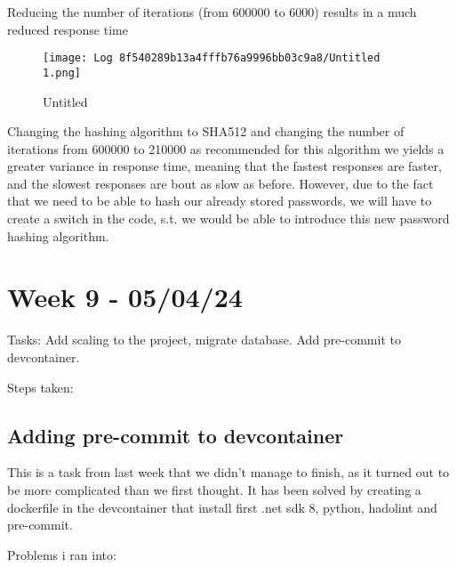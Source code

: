 Reducing the number of iterations (from 600000 to 6000) results in a much reduced response time

\begin{figure}
\centering
\texttt{[image: Log 8f540289b13a4fffb76a9996bb03c9a8/Untitled 1.png]}
\caption{Untitled}
\end{figure}

Changing the hashing algorithm to SHA512 and changing the number of iterations from 600000 to 210000 as recommended for this algorithm we yields a greater variance in response time, meaning that the fastest responses are faster, and the slowest responses are bout as slow as before. However, due to the fact that we need to be able to hash our already stored passwords, we will have to create a switch in the code, s.t. we would be able to introduce this new password hashing algorithm.

\section{Week 9 - 05/04/24}
\label{log:week9}

Tasks: Add scaling to the project, migrate database. Add pre-commit to
devcontainer.

Steps taken:

\subsection{Adding pre-commit to devcontainer}
\label{log:adding-pre-commit-to-devcontainer}

This is a task from last week that we didn't manage to finish, as it turned out to be more complicated than we first thought. It has been solved by creating a dockerfile in the devcontainer that install first .net sdk 8, python, hadolint and pre-commit.

Problems i ran into:

